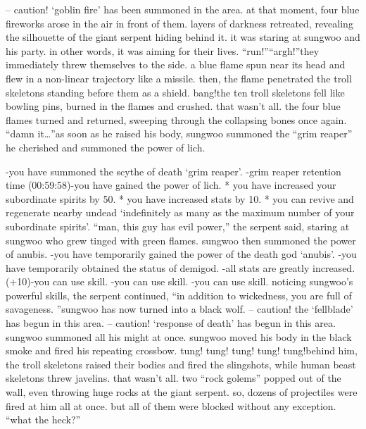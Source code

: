 – caution! ‘goblin fire’ has been summoned in the area.
at that moment, four blue fireworks arose in the air in front of them.
 layers of darkness retreated, revealing the silhouette of the giant serpent hiding behind it.
it was staring at sungwoo and his party.
 in other words, it was aiming for their lives.
“run!”“argh!”they immediately threw themselves to the side.
a blue flame spun near its head and flew in a non-linear trajectory like a missile.
then, the flame penetrated the troll skeletons standing before them as a shield.
bang!the ten troll skeletons fell like bowling pins, burned in the flames and crushed.
that wasn’t all.
 the four blue flames turned and returned, sweeping through the collapsing bones once again.
“damn it…”as soon as he raised his body, sungwoo summoned the “grim reaper” he cherished and summoned the power of lich.


-you have summoned the scythe of death ‘grim reaper’.
-grim reaper retention time (00:59:58)-you have gained the power of lich.
* you have increased your subordinate spirits by 50.
* you have increased stats by 10.
* you can revive and regenerate nearby undead ‘indefinitely as many as the maximum number of your subordinate spirits’.
“man, this guy has evil power,” the serpent said, staring at sungwoo who grew tinged with green flames.
sungwoo then summoned the power of anubis.
-you have temporarily gained the power of the death god ‘anubis’.
-you have temporarily obtained the status of demigod.
-all stats are greatly increased.
 (+10)-you can use  skill.
-you can use  skill.
-you can use  skill.
noticing sungwoo’s powerful skills, the serpent continued, “in addition to wickedness, you are full of savageness.
”sungwoo has now turned into a black wolf.
– caution! the ‘fellblade’ has begun in this area.
– caution! ‘response of death’ has begun in this area.
sungwoo summoned all his might at once.
 sungwoo moved his body in the black smoke and fired his repeating crossbow.
tung! tung! tung! tung! tung!behind him, the troll skeletons raised their bodies and fired the slingshots, while human beast skeletons threw javelins.
 that wasn’t all.
 two “rock golems” popped out of the wall, even throwing huge rocks at the giant serpent.
so, dozens of projectiles were fired at him all at once.
but all of them were blocked without any exception.
“what the heck?”

 